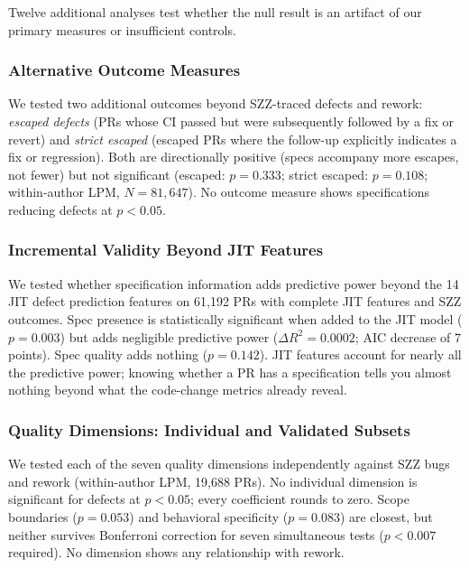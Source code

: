 \documentclass[a4paper,UKenglish,cleveref,autoref,thm-restate]{lipics-v2021}
\begin{document}
Twelve additional analyses test whether the null result is an artifact of our primary measures or insufficient controls.

\subsubsection{Alternative Outcome Measures}

We tested two additional outcomes beyond SZZ-traced defects and rework: \emph{escaped defects} (PRs whose CI passed but were subsequently followed by a fix or revert) and \emph{strict escaped} (escaped PRs where the follow-up explicitly indicates a fix or regression). Both are directionally positive (specs accompany more escapes, not fewer) but not significant (escaped: $p = 0.333$; strict escaped: $p = 0.108$; within-author LPM, $N = 81{,}647$). No outcome measure shows specifications reducing defects at $p < 0.05$.

\subsubsection{Incremental Validity Beyond JIT Features}

We tested whether specification information adds predictive power beyond the 14 JIT defect prediction features \cite{kamei2013} on 61,192 PRs with complete JIT features and SZZ outcomes. Spec presence is statistically significant when added to the JIT model ($p = 0.003$) but adds negligible predictive power ($\Delta R^2 = 0.0002$; AIC decrease of 7 points). Spec quality adds nothing ($p = 0.142$). JIT features account for nearly all the predictive power; knowing whether a PR has a specification tells you almost nothing beyond what the code-change metrics already reveal.

\subsubsection{Quality Dimensions: Individual and Validated Subsets}

We tested each of the seven quality dimensions independently against SZZ bugs and rework (within-author LPM, 19,688 PRs). No individual dimension is significant for defects at $p < 0.05$; every coefficient rounds to zero. Scope boundaries ($p = 0.053$) and behavioral specificity ($p = 0.083$) are closest, but neither survives Bonferroni correction for seven simultaneous tests ($p < 0.007$ required). No dimension shows any relationship with rework.
\end{document}

